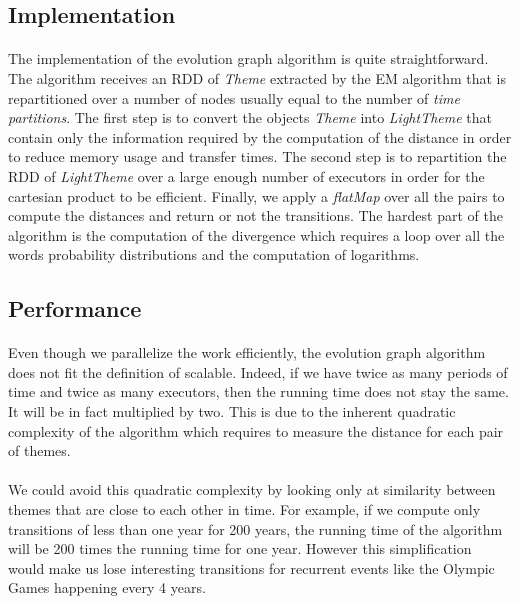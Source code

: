 \subsection{Implementation}
\label{sec:EvoGraphImplementation}
\paragraph{}
The implementation of the evolution graph algorithm is quite straightforward. The algorithm receives an RDD of \emph{Theme} extracted by the EM algorithm that is repartitioned over a number of nodes usually equal to the number of \emph{time partitions}. The first step is to convert the objects \emph{Theme} into \emph{LightTheme} that contain only the information required by the computation of the distance in order to reduce memory usage and transfer times. The second step is to repartition the RDD of \emph{LightTheme} over a large enough number of executors in order for the cartesian product to be efficient. Finally, we apply a \emph{flatMap} over all the pairs to compute the distances and return or not the transitions. The hardest part of the algorithm is the computation of the divergence which requires a loop over all the words probability distributions and the computation of logarithms.


\subsection{Performance}
\label{sec:EvoGraphPerformance}
\paragraph{}
Even though we parallelize the work efficiently, the evolution graph algorithm does not fit the definition of scalable. Indeed, if we have twice as many periods of time and twice as many executors, then the running time does not stay the same. It will be in fact multiplied by two. This is due to the inherent quadratic complexity of the algorithm which requires to measure the distance for each pair of themes.

\paragraph{}
We could avoid this quadratic complexity by looking only at similarity between themes that are close to each other in time. For example, if we compute only transitions of less than one year for 200 years, the running time of the algorithm will be 200 times the running time for one year. However this simplification would make us lose interesting transitions for recurrent events like the Olympic Games happening every 4 years. 


